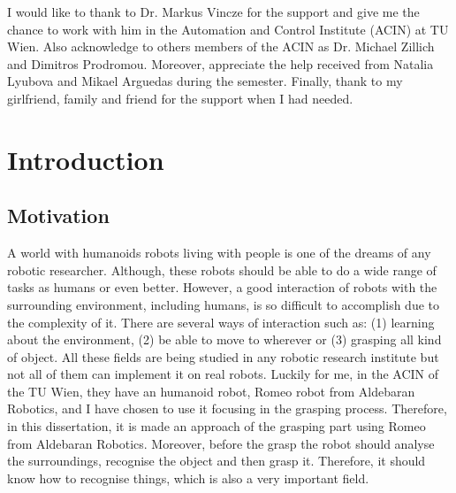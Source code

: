 \documentclass[12pt,a4paper,final,twoside,openright]{report}
\begin{document}
I would like to thank to Dr. Markus Vincze for the support and give me the chance to work with him in the Automation and Control Institute (ACIN) at TU Wien. Also acknowledge to others members of the ACIN as Dr. Michael Zillich and Dimitros Prodromou. Moreover, appreciate the help received from Natalia Lyubova and Mikael Arguedas during the semester. Finally, thank to my girlfriend, family and friend for the support when I had needed.


\chapter{Introduction}

\section{Motivation}

A world with humanoids robots living with people is one of the dreams of any robotic researcher. Although, these robots should be able to do a wide range of tasks as humans or even better. However, a good interaction of robots with the surrounding environment, including humans, is so difficult to accomplish due to the complexity of it. There are several ways of interaction such as: (1) learning about the environment, (2) be able to move to wherever or (3) grasping all kind of object. All these fields are being studied in any robotic research institute but not all of them can implement it on real robots. Luckily for me, in the ACIN of the TU Wien, they have an humanoid robot, Romeo robot from Aldebaran Robotics, and I have chosen to use it focusing in the grasping process. Therefore, in this dissertation, it is made an approach of the grasping part using Romeo from Aldebaran Robotics. Moreover, before the grasp the robot should analyse the surroundings, recognise the object and then grasp it. Therefore, it should know how to recognise things, which is also a very important field.  

\end{document}
